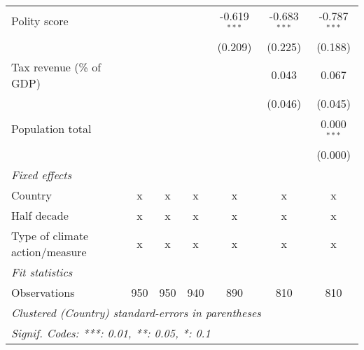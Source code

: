 \begin{tabular}{lcccccc}
   Polity score                                            &               &               &               & -0.619$^{***}$ & -0.683$^{***}$ & -0.787$^{***}$\\   
                                                           &               &               &               & (0.209)        & (0.225)        & (0.188)\\   
   Tax revenue (\% of GDP)                                 &               &               &               &                & 0.043          & 0.067\\   
                                                           &               &               &               &                & (0.046)        & (0.045)\\   
   Population total                                        &               &               &               &                &                & 0.000$^{***}$\\   
                                                           &               &               &               &                &                & (0.000)\\   
   \emph{Fixed effects}\\
   Country                                                 & x             & x             & x             & x              & x              & x\\  
   Half decade                                             & x             & x             & x             & x              & x              & x\\  
   Type of climate action/measure                          & x             & x             & x             & x              & x              & x\\  
   \midrule \emph{Fit statistics}\\
   Observations                                            & 950           & 950           & 940           & 890            & 810            & 810\\  
   \midrule
   \multicolumn{7}{l}{\emph{Clustered (Country) standard-errors in parentheses}}\\
   \multicolumn{7}{l}{\emph{Signif. Codes: ***: 0.01, **: 0.05, *: 0.1}}\\
\end{tabular}
\par\endgroup


